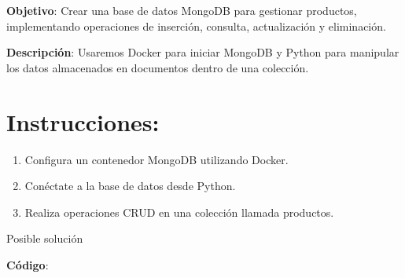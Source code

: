 \documentclass[
  a4paper,
  DIV=11,
  numbers=noendperiod,
  onepage,
  openany]{scrreprt}
\providecommand{\tightlist}{%
  \setlength{\itemsep}{0pt}\setlength{\parskip}{0pt}}\usepackage{longtable,booktabs,array}
\begin{document}
\textbf{Objetivo}: Crear una base de datos MongoDB para gestionar
productos, implementando operaciones de inserción, consulta,
actualización y eliminación.

\textbf{Descripción}: Usaremos Docker para iniciar MongoDB y Python para
manipular los datos almacenados en documentos dentro de una colección.

\section{Instrucciones:}\label{instrucciones-11}

\begin{enumerate}
\def\labelenumi{\arabic{enumi}.}
\tightlist
\item
  Configura un contenedor MongoDB utilizando Docker.
\item
  Conéctate a la base de datos desde Python.
\item
  Realiza operaciones CRUD en una colección llamada productos.
\end{enumerate}

Posible solución

\textbf{Código}:
\end{document}
